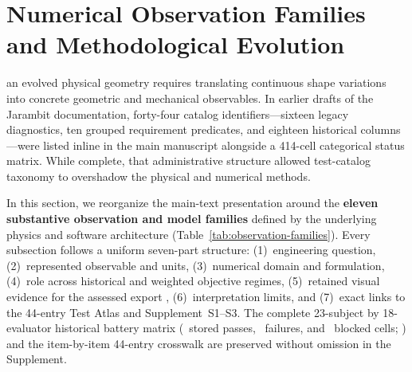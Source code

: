 \section{Numerical Observation Families and Methodological Evolution}
\label{sec:battery}
 an evolved physical geometry requires translating continuous shape variations into concrete geometric and mechanical observables. In earlier drafts of the Jarambit documentation, forty-four catalog identifiers---sixteen legacy  diagnostics, ten grouped  requirement predicates, and eighteen historical  columns---were listed inline in the main manuscript alongside a 414-cell categorical status matrix. While complete, that administrative structure allowed test-catalog taxonomy to overshadow the physical and numerical methods.

In this section, we reorganize the main-text presentation around the \textbf{eleven substantive observation and model families} defined by the underlying physics and software architecture (Table~\ref{tab:observation-families}). Every subsection follows a uniform seven-part structure: (1)~engineering question, (2)~represented observable and units, (3)~numerical domain and formulation, (4)~role across historical and weighted objective regimes, (5)~retained visual evidence for the assessed export , (6)~interpretation limits, and (7)~exact links to the 44-entry Test Atlas and Supplement~S1--S3. The complete 23-subject by 18-evaluator historical battery matrix (\BatteryPass\ stored passes, \BatteryFail\ failures, and \BatteryBlocked\ blocked cells; ) and the item-by-item 44-entry crosswalk are preserved without omission in the Supplement.


